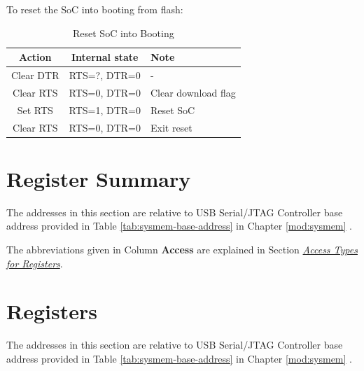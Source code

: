 \documentclass[main\_\_EN.tex]{subfiles}
\begin{document}
To reset the SoC into booting from flash:

\begin{table}[H]
    \centering
    \caption{Reset SoC into Booting}
    \label{tab:usbserialjtag-reset-soc-into-booting}
    \begin{tabular} {|c|c|l|}
    \hline
        \rowcolor{lightgray}
        \textbf{Action} & \textbf{Internal state} & \textbf{Note} \\\hline

        Clear DTR & RTS=?, DTR=0 & - \\\hline
        Clear RTS & RTS=0, DTR=0 &  Clear download flag \\\hline
        Set RTS & RTS=1, DTR=0 & Reset SoC \\\hline
        Clear RTS & RTS=0, DTR=0 & Exit reset \\\hline
    \end{tabular}
\end{table}




\clearpage
\section{Register Summary}
\label{sec:usbserialjtag-reg-summ}
\hypertarget{usbserialjtag-reg-summ}{}

The addresses in this section are relative to USB Serial/JTAG Controller base address provided in Table \ref{tab:sysmem-base-address} in Chapter \ref{mod:sysmem} \textit{}.

The abbreviations given in Column \textbf{Access} are explained in Section \hyperref[glossary-access-types]{\textit{Access Types for Registers}}.






\clearpage
\section{Registers}

The addresses in this section are relative to USB Serial/JTAG Controller base address provided in Table \ref{tab:sysmem-base-address} in Chapter \ref{mod:sysmem} \textit{}.


\end{document}
